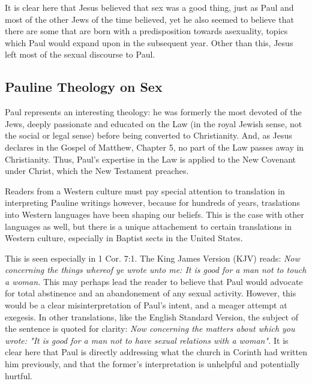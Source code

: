 \documentclass[12pt]{article}
\begin{document}
    \par It is clear here that Jesus believed that sex was a good thing, just
    as Paul and most of the other Jews of the time believed, yet he also 
    seemed to believe that there are some that are born with a 
    predisposition towards asexuality, topics which Paul would expand upon
    in the subsequent year. Other than this, Jesus left most of the sexual 
    discourse to Paul.

\subsection{Pauline Theology on Sex}

    \par Paul represents an interesting theology: he was formerly the most
        devoted of the Jews, deeply passionate and educated on the Law (in
        the royal Jewish sense, not the social or legal sense) before being
        converted to Christianity. 
        And, as Jesus declares in the Gospel of Matthew, Chapter 5, no part
        of the Law passes away in Christianity. Thus, Paul's expertise in the
        Law is applied to the New Covenant under Christ, which the New
        Testament preaches. \\

    \par Readers from a Western culture must pay special attention to
        translation in interpreting Pauline writings however, because for
        hundreds of years, traslations into Western languages have been shaping
        our beliefs. This is the case with other languages as well, but there
        is a unique attachement to certain translations in Western culture,
        especially in Baptist sects in the United States. \\

    \par This is seen especially in 1 Cor. 7:1. The King James Version (KJV)
        reads: \textit{Now concerning the things whereof ye wrote unto me: 
        It is good for a man not to touch a woman.} This may perhaps lead
        the reader to believe that Paul would advocate for total abstinence
        and an abandonement of any sexual activity. However, this would be
        a clear misinterpretation of Paul's intent, and a meager attempt at
        exegesis. In other translations, like the English Standard Version,
        the subject of the sentence is quoted for clarity: \textit{Now
        concerning the matters about which you wrote: "It is good for a
        man not to have sexual relations with a woman".}\cite{esv2016}
        It is clear here
        that Paul is directly addressing what the church in Corinth had
        written him previously\cite{kjv_sex}, and that the former's
        interpretation is unhelpful and potentially hurtful. \\
\end{document}
